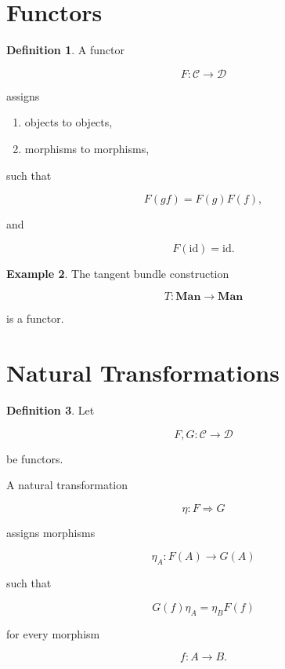 \documentclass[11pt]{book}
\numberwithin{equation}{chapter}
\theoremstyle{definition}
\newtheorem{definition}{Definition}[chapter]
\newtheorem{example}[definition]{Example}
\theoremstyle{plain}
\begin{document}

\section{Functors}

\begin{definition}

A functor

\[
F:\mathcal C\rightarrow\mathcal D
\]

assigns

\begin{enumerate}

\item
objects to objects,

\item
morphisms to morphisms,

\end{enumerate}

such that

\[
F(gf)
=
F(g)F(f),
\]

and

\[
F(\mathrm{id})
=
\mathrm{id}.
\]

\end{definition}


\begin{example}

The tangent bundle construction

\[
T:\mathbf{Man}
\rightarrow
\mathbf{Man}
\]

is a functor.

\end{example}


\section{Natural Transformations}

\begin{definition}

Let

\[
F,G:
\mathcal C
\rightarrow
\mathcal D
\]

be functors.

A natural transformation

\[
\eta:F\Rightarrow G
\]

assigns morphisms

\[
\eta_A:
F(A)
\rightarrow
G(A)
\]

such that

\[
G(f)\eta_A
=
\eta_BF(f)
\]

for every morphism

\[
f:A\rightarrow B.
\]

\end{definition}
\end{document}
